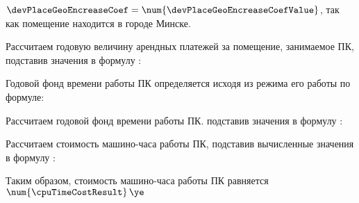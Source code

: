 \(\devPlaceGeoEncreaseCoef = \num{\devPlaceGeoEncreaseCoefValue}\), так как помещение находится в городе Минске.

Рассчитаем годовую величину арендных платежей за помещение, занимаемое ПК, подставив значения в формулу :
\devPlaceRentCostFormulaApplied

Годовой фонд времени работы ПК определяется исходя из режима его работы по формуле:
\pcWorkabilityFundEquation

Рассчитаем годовой фонд времени работы ПК. подставив значения в формулу :
\pcWorkabilityFundFormulaApplied

Рассчитаем стоимость машино-часа работы ПК, подставив вычисленные значения в формулу :
\pcPcHourCostFormulaApplied

Таким образом, стоимость машино-часа работы ПК равняется \(\num{\cpuTimeCostResult} \, \ye\)